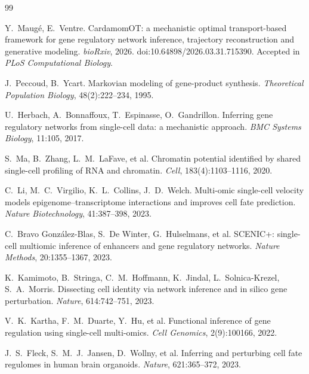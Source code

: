 \documentclass[a4paper, 11pt]{article}
\theoremstyle{plain}
\theoremstyle{remark}
\begin{document}
\begin{thebibliography}{99}

Y.~Maugé, E.~Ventre.
\newblock CardamomOT: a mechanistic optimal transport-based framework for gene regulatory network inference, trajectory reconstruction and generative modeling.
\newblock \emph{bioRxiv}, 2026. doi:10.64898/2026.03.31.715390. Accepted in \emph{PLoS Computational Biology}.

J.~Peccoud, B.~Ycart.
\newblock Markovian modeling of gene-product synthesis.
\newblock \emph{Theoretical Population Biology}, 48(2):222--234, 1995.

U.~Herbach, A.~Bonnaffoux, T.~Espinasse, O.~Gandrillon.
\newblock Inferring gene regulatory networks from single-cell data: a mechanistic approach.
\newblock \emph{BMC Systems Biology}, 11:105, 2017.

S.~Ma, B.~Zhang, L.~M.~LaFave, et al.
\newblock Chromatin potential identified by shared single-cell profiling of RNA and chromatin.
\newblock \emph{Cell}, 183(4):1103--1116, 2020.

C.~Li, M.~C.~Virgilio, K.~L.~Collins, J.~D.~Welch.
\newblock Multi-omic single-cell velocity models epigenome--transcriptome interactions and improves cell fate prediction.
\newblock \emph{Nature Biotechnology}, 41:387--398, 2023.

C.~Bravo González-Blas, S.~De Winter, G.~Hulselmans, et al.
\newblock SCENIC+: single-cell multiomic inference of enhancers and gene regulatory networks.
\newblock \emph{Nature Methods}, 20:1355--1367, 2023.

K.~Kamimoto, B.~Stringa, C.~M.~Hoffmann, K.~Jindal, L.~Solnica-Krezel, S.~A.~Morris.
\newblock Dissecting cell identity via network inference and in silico gene perturbation.
\newblock \emph{Nature}, 614:742--751, 2023.

V.~K.~Kartha, F.~M.~Duarte, Y.~Hu, et al.
\newblock Functional inference of gene regulation using single-cell multi-omics.
\newblock \emph{Cell Genomics}, 2(9):100166, 2022.

J.~S.~Fleck, S.~M.~J.~Jansen, D.~Wollny, et al.
\newblock Inferring and perturbing cell fate regulomes in human brain organoids.
\newblock \emph{Nature}, 621:365--372, 2023.


\end{thebibliography}
\end{document}
